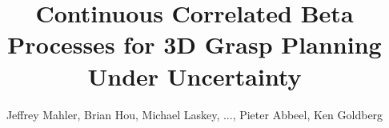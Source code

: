 \documentclass[letterpaper, 10 pt, conference]{ieeeconf}  %
\begin{document}
\title{\LARGE \bf Continuous Correlated Beta Processes for 3D Grasp Planning Under Uncertainty
	}
\author{Jeffrey Mahler, Brian Hou, Michael Laskey, ..., Pieter Abbeel, Ken Goldberg}
\maketitle

%
%
%
%
%


%
%
%
%

%



\end{document}
